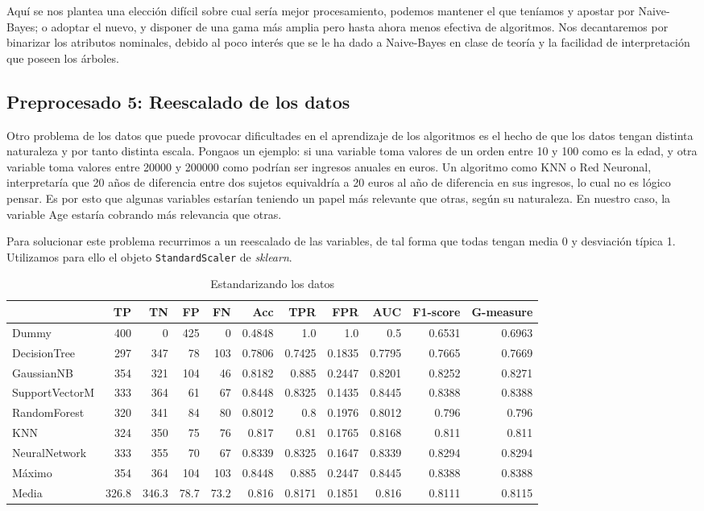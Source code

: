 \documentclass{article}
\begin{document}
Aquí se nos plantea una elección difícil sobre cual sería mejor
procesamiento, podemos mantener el que teníamos y apostar por
Naive-Bayes; o adoptar el nuevo, y disponer de una gama más amplia
pero hasta ahora menos efectiva de algoritmos. Nos decantaremos por
binarizar los atributos nominales, debido al poco interés que se le ha
dado a Naive-Bayes en clase de teoría y la facilidad de interpretación
que poseen los árboles.

\subsection{Preprocesado 5: Reescalado de los datos}

Otro problema de los datos que puede provocar dificultades en el
aprendizaje de los algoritmos es el hecho de que los datos tengan
distinta naturaleza y por tanto distinta escala. Pongaos un ejemplo:
si una variable toma valores de un orden entre 10 y 100 como es la
edad, y otra variable toma valores entre 20000 y 200000 como podrían
ser ingresos anuales en euros. Un algoritmo como KNN o Red Neuronal,
interpretaría que 20 años de diferencia entre dos sujetos equivaldría
a 20 euros al año de diferencia en sus ingresos, lo cual no es lógico
pensar. Es por esto que algunas variables estarían teniendo un papel
más relevante que otras, según su naturaleza. En nuestro caso, la
variable Age estaría cobrando más relevancia que otras.

Para solucionar este problema recurrimos a un reescalado de las
variables, de tal forma que todas tengan media 0 y desviación típica
1. Utilizamos para ello el objeto \texttt{StandardScaler} de
\textit{sklearn}.

\begin{table}[H]
\centering
\caption{Estandarizando los datos}
\label{tab:stdScaler}
\begin{tabular}{|lrrrrrrrrrr|}
\hline
 & TP & TN & FP & FN & Acc & TPR & FPR & AUC & F1-score & G-measure\\ \hline
Dummy & 400 & 0 & 425 & 0 & 0.4848 & 1.0 & 1.0 & 0.5 & 0.6531 & 0.6963\\
DecisionTree & 297 & 347 & 78 & 103 & 0.7806 & 0.7425 & 0.1835 & 0.7795 & 0.7665 & 0.7669\\
GaussianNB & 354 & 321 & 104 & 46 & 0.8182 & 0.885 & 0.2447 & 0.8201 & 0.8252 & 0.8271\\
SupportVectorM & 333 & 364 & 61 & 67 & 0.8448 & 0.8325 & 0.1435 & 0.8445 & 0.8388 & 0.8388\\
RandomForest & 320 & 341 & 84 & 80 & 0.8012 & 0.8 & 0.1976 & 0.8012 & 0.796 & 0.796\\
KNN & 324 & 350 & 75 & 76 & 0.817 & 0.81 & 0.1765 & 0.8168 & 0.811 & 0.811\\
NeuralNetwork & 333 & 355 & 70 & 67 & 0.8339 & 0.8325 & 0.1647 & 0.8339 & 0.8294 & 0.8294\\ \hline
Máximo & 354 & 364 & 104 & 103 & 0.8448 & 0.885 & 0.2447 & 0.8445 & 0.8388 & 0.8388\\
Media & 326.8 & 346.3 & 78.7 & 73.2 & 0.816 & 0.8171 & 0.1851 & 0.816 & 0.8111 & 0.8115\\
\hline
\end{tabular}
\end{table}
\end{document}
